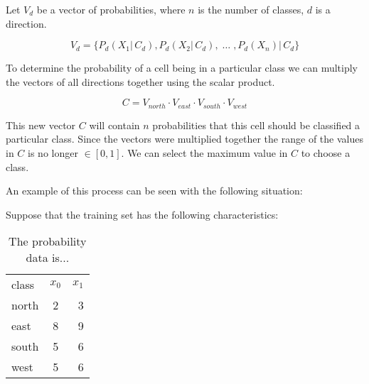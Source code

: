 \documentclass[preprint,5p,times,twocolumn]{elsarticle}
\begin{document}
Let $V_{d}$ be a vector of probabilities, where $n$ is the number of classes,
$d$ is a direction.

\begin{equation}
V_{d} = \{P_{d}{(X_{1} | \, C_{d})}, P_{d}{(X_{2} | \, C_{d}),\; \ldots \; , P_{d}{(X_{n}) | \, C_{d}}}\}
\end{equation}

 To determine the probability of a cell being in a particular class
we can multiply the vectors of all directions together using the scalar
product.

\begin{equation}
C = V_{north} \cdot V_{east} \cdot V_{south} \cdot V_{west}
\end{equation}

This new vector $C$ will contain $n$ probabilities that this cell should be
classified a particular class. Since the vectors were multiplied together the
range of the values in $C$ is no longer $\in[0,1]$. We can select the maximum
value in $C$ to choose a class.

An example of this process can be seen with the following situation:

\begin{center}
\end{center}

Suppose that the training set has the following characteristics:

\begin{table}
\begin{tabular}{ l c r }
    class & $x_{0}$ & $x_{1}$ \\
    north & 2 & 3 \\
    east  & 8 & 9 \\
    south & 5 & 6 \\
    west  & 5 & 6 \\
\end{tabular}
\caption{The probability data is...} %
\end{table}
\end{document}
